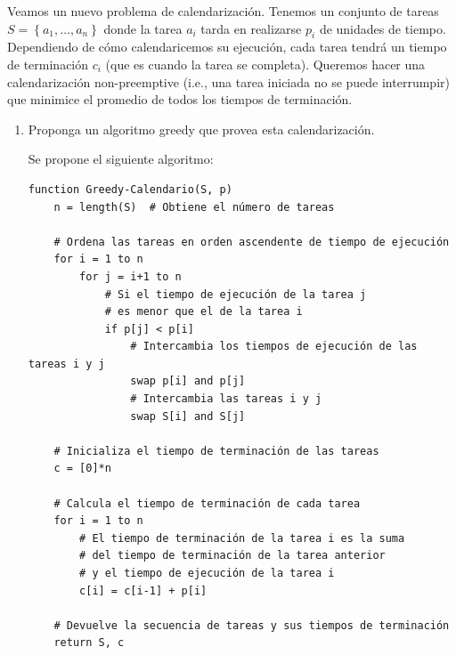 




\begin{problema}
    Veamos un nuevo problema de calendarización. Tenemos un conjunto de tareas $S=\left\{a_{1}, \ldots, a_{n}\right\}$ donde la tarea $a_{i}$ tarda en realizarse $p_{i}$ de unidades de tiempo. Dependiendo de cómo calendaricemos su ejecución, cada tarea tendrá un tiempo de terminación $c_{i}$ (que es cuando la tarea se completa). Queremos hacer una calendarización non-preemptive (i.e., una tarea iniciada no se puede interrumpir) que minimice el promedio de todos los tiempos de terminación.
    \begin{enumerate}
        \item Proponga un algoritmo greedy que provea esta calendarización.
        \begin{sol}
            Se propone el siguiente algoritmo:
            \begin{verbatim}
function Greedy-Calendario(S, p)
    n = length(S)  # Obtiene el número de tareas

    # Ordena las tareas en orden ascendente de tiempo de ejecución
    for i = 1 to n
        for j = i+1 to n
            # Si el tiempo de ejecución de la tarea j 
            # es menor que el de la tarea i
            if p[j] < p[i]
                # Intercambia los tiempos de ejecución de las tareas i y j
                swap p[i] and p[j]
                # Intercambia las tareas i y j
                swap S[i] and S[j]

    # Inicializa el tiempo de terminación de las tareas
    c = [0]*n

    # Calcula el tiempo de terminación de cada tarea
    for i = 1 to n
        # El tiempo de terminación de la tarea i es la suma
        # del tiempo de terminación de la tarea anterior
        # y el tiempo de ejecución de la tarea i
        c[i] = c[i-1] + p[i]

    # Devuelve la secuencia de tareas y sus tiempos de terminación
    return S, c
            

\end{verbatim}
\end{sol}
\end{enumerate}
\end{problema}
